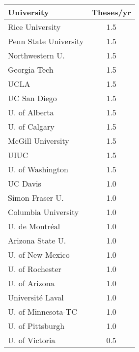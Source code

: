 \documentclass[aspectratio=169]{beamer}
\begin{document}
\begin{frame}[fragile]
\begin{columns}[T]
\begin{column}{0.5\textwidth}
            \begin{tabularx}{\linewidth}{lS[table-format=1.1]}
                \toprule
                \textbf{University} & {\textbf{Theses/yr}} \\
                \midrule
                Rice University & 1.5 \\
                Penn State University & 1.5 \\
                Northwestern U. & 1.5 \\
                Georgia Tech & 1.5 \\
                UCLA & 1.5 \\
                UC San Diego & 1.5 \\
                U. of Alberta & 1.5 \\
                U. of Calgary & 1.5 \\
                McGill University & 1.5 \\
                UIUC & 1.5 \\
                U. of Washington & 1.5 \\
                UC Davis & 1.0 \\
                Simon Fraser U. & 1.0 \\
                Columbia University & 1.0 \\
                U. de Montréal & 1.0 \\
                Arizona State U. & 1.0 \\
                U. of New Mexico & 1.0 \\
                U. of Rochester & 1.0 \\
                U. of Arizona & 1.0 \\
                Université Laval & 1.0 \\
                U. of Minnesota-TC & 1.0 \\
                U. of Pittsburgh & 1.0 \\
                U. of Victoria & 0.5 \\
                \bottomrule
            \end{tabularx}
        \end{column}
    \end{columns}
\end{frame}
\end{document}
